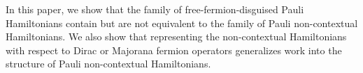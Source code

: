 \documentclass[%
 aip,
 amsmath,amssymb,
 reprint,%
]{revtex4-1}
\begin{document}
\indent In this paper, we show that the family of free-fermion-disguised Pauli Hamiltonians contain but are not equivalent to the family of Pauli non-contextual Hamiltonians. We also show that representing the non-contextual Hamiltonians with respect to Dirac or Majorana fermion operators generalizes work into the structure of Pauli non-contextual Hamiltonians. %
\end{document}
